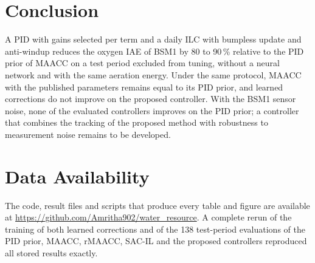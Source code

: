 \documentclass[journal]{IEEEtran}
\begin{document}
\section{Conclusion}

A PID with gains selected per term and a daily ILC with bumpless update and
anti-windup reduces the oxygen IAE of BSM1 by 80 to 90\,\% relative to the
PID prior of MAACC on a test period excluded from tuning, without a neural
network and with the same aeration energy. Under the same protocol, MAACC
with the published parameters remains equal to its PID prior, and learned
corrections do not improve on the proposed controller. With the BSM1 sensor
noise, none of the evaluated controllers improves on the PID prior; a
controller that combines the tracking of the proposed method with
robustness to measurement noise remains to be developed.

\section*{Data Availability}
The code, result files and scripts that produce every table and figure are
available at \url{https://github.com/Amritha902/water_resource}. A complete
rerun of the training of both learned corrections and of the 138 test-period
evaluations of the PID prior, MAACC, rMAACC, SAC-IL and the proposed
controllers reproduced all stored results exactly.
\end{document}
